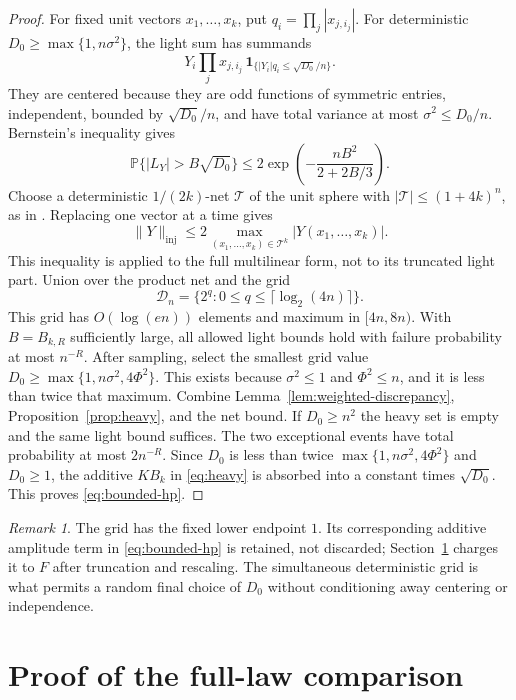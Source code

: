 \documentclass[11pt]{article}
\theoremstyle{spaced}
\theoremstyle{remark}
\newtheorem{remark}[theorem]{Remark}
\numberwithin{equation}{section}
\newcommand{\Pp}{\mathbb P}
\newcommand{\inj}{\mathrm{inj}}
\begin{document}
\begin{proof}
For fixed unit vectors $x_1,\ldots,x_k$, put
$q_i=\prod_j|x_{j,i_j}|$. For deterministic
$D_0\ge\max\{1,n\sigma^2\}$, the light sum has summands
\[
 Y_i\prod_jx_{j,i_j}\,
 \mathbf1_{\{|Y_i|q_i\le\sqrt{D_0}/n\}}.
\]
They are centered because they are odd functions of symmetric entries,
independent, bounded by $\sqrt{D_0}/n$, and have total variance at most
$\sigma^2\le D_0/n$. Bernstein's inequality gives
\[
 \Pp\{|L_Y|>B\sqrt{D_0}\}
 \le2\exp\left(-\frac{nB^2}{2+2B/3}\right).
\]
Choose a deterministic $1/(2k)$-net $\mathcal T$ of the unit
sphere with $|\mathcal T|\le(1+4k)^n$, as in
\cite[Lemma~4.1]{ZZ}. Replacing one vector at a time gives
\[
 \|Y\|_{\inj}\le2\max_{(x_1,\ldots,x_k)\in\mathcal T^k}
 |Y(x_1,\ldots,x_k)|.
\]
This inequality is applied to the full multilinear form, not to its
truncated light part. Union over the product net and the grid
\[
 \mathcal D_n=\{2^q:0\le q\le\lceil\log_2(4n)\rceil\}.
\]
This grid has $O(\log(en))$ elements and maximum in $[4n,8n)$.
With $B=B_{k,R}$ sufficiently large, all allowed light bounds hold
with failure probability at most $n^{-R}$. After sampling, select the
smallest grid value
$D_0\ge\max\{1,n\sigma^2,4\Phi^2\}$.
This exists because $\sigma^2\le1$ and $\Phi^2\le n$, and it is less
than twice that maximum. Combine Lemma~\ref{lem:weighted-discrepancy},
Proposition~\ref{prop:heavy}, and the net bound.
If $D_0\ge n^2$ the heavy set is empty and the same light bound suffices.
The two exceptional events have total probability at most
$2n^{-R}$. Since $D_0$ is less than twice
$\max\{1,n\sigma^2,4\Phi^2\}$ and $D_0\ge1$, the additive $KB_k$
in \eqref{eq:heavy} is absorbed into a constant times $\sqrt{D_0}$.
This proves \eqref{eq:bounded-hp}.
\end{proof}

\begin{remark}
The grid has the fixed lower endpoint $1$. Its corresponding additive
amplitude term in \eqref{eq:bounded-hp} is retained, not discarded;
Section~\ref{sec:assembly} charges it to $F$ after truncation and rescaling.
The simultaneous deterministic grid is what permits a random final
choice of $D_0$ without conditioning away centering or independence.
\end{remark}

\clearpage
\section{Proof of the full-law comparison}\label{sec:assembly}
\end{document}
